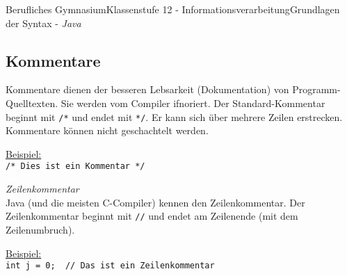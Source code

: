 \documentclass[11pt,oneside,openany,headings=optiontotoc,11pt,numbers=noenddot]{article}
\begin{document}
\begin{worksheet}{Berufliches Gymnasium}{Klassenstufe 12 - Informationsverarbeitung}{Grundlagen der Syntax - \textit{Java}}
		\subsection{Kommentare}
		Kommentare dienen der besseren Lebsarkeit (Dokumentation) von Programm-Quelltexten. Sie werden vom Compiler ifnoriert. Der Standard-Kommentar beginnt mit \lstinline[style=JavaInputStyle]|/*| und endet mit \lstinline[style=JavaInputStyle]|*/|. Er kann sich über mehrere Zeilen erstrecken. Kommentare können nicht geschachtelt werden.\\
		\par\noindent
		\underline{Beispiel:}\\
		\lstinline[style=JavaInputStyle]|/* Dies ist ein Kommentar */|\\
		\par\noindent
		\textit{Zeilenkommentar}\\
		Java (und die meisten C-Compiler) kennen den Zeilenkommentar. Der Zeilenkommentar beginnt mit \lstinline[style=JavaInputStyle]|//| und endet am Zeilenende (mit dem Zeilenumbruch).\\
		\par\noindent
		\underline{Beispiel:}\\
		\lstinline[style=JavaInputStyle]|int j = 0;  // Das ist ein Zeilenkommentar|
	\end{worksheet}
\end{document}

